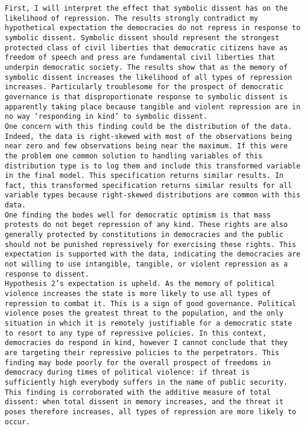 \documentclass[ignorenonframetext,]{beamer}
\begin{document}
\begin{frame}[fragile]
\begin{verbatim}
First, I will interpret the effect that symbolic dissent has on the likelihood of repression. The results strongly contradict my hypothetical expectation the democracies do not repress in response to symbolic dissent. Symbolic dissent should represent the strongest protected class of civil liberties that democratic citizens have as freedom of speech and press are fundamental civil liberties that underpin democratic society. The results show that as the memory of symbolic dissent increases the likelihood of all types of repression increases. Particularly troublesome for the prospect of democratic governance is that disproportionate response to symbolic dissent is apparently taking place because tangible and violent repression are in no way ‘responding in kind’ to symbolic dissent. 
One concern with this finding could be the distribution of the data. Indeed, the data is right-skewed with most of the observations being near zero and few observations being near the maximum. If this were the problem one common solution to handling variables of this distribution type is to log them and include this transformed variable in the final model. This specification returns similar results. In fact, this transformed specification returns similar results for all variable types because right-skewed distributions are common with this data. 
One finding the bodes well for democratic optimism is that mass protests do not beget repression of any kind. These rights are also generally protected by constitutions in democracies and the public should not be punished repressively for exercising these rights. This expectation is supported with the data, indicating the democracies are not willing to use intangible, tangible, or violent repression as a response to dissent. 
Hypothesis 2’s expectation is upheld. As the memory of political violence increases the state is more likely to use all types of repression to combat it. This is a sign of good governance. Political violence poses the greatest threat to the population, and the only situation in which it is remotely justifiable for a democratic state to resort to any type of repressive policies. In this context, democracies do respond in kind, however I cannot conclude that they are targeting their repressive policies to the perpetrators. This finding may bode poorly for the overall prospect of freedoms in democracy during times of political violence: if threat is sufficiently high everybody suffers in the name of public security. This finding is corroborated with the additive measure of total dissent: when total dissent in memory increases, and the threat it poses therefore increases, all types of repression are more likely to occur. 

\end{verbatim}
\end{frame}
\end{document}
